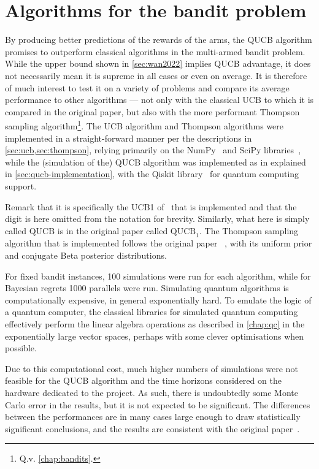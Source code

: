 \section{Algorithms for the bandit problem}
By producing better predictions of the rewards of the arms, the QUCB algorithm promises to outperform classical algorithms in the multi-armed bandit problem.
While the upper bound shown in \cref{sec:wan2022} implies QUCB advantage, it does not necessarily mean it is supreme in all cases or even on average.
It is therefore of much interest to test it on a variety of problems and compare its average performance to other algorithms — not only with the classical UCB to which it is compared in the original paper, but also with the more performant Thompson sampling algorithm\footnote{Q.v. \cref{chap:bandits}.}.
The UCB algorithm and Thompson algorithms were implemented in a straight-forward manner per the descriptions in \cref{sec:ucb,sec:thompson}, relying primarily on the NumPy~\autocite{numpy} and SciPy libraries~\autocite{scipy}, while the (simulation of the) QUCB algorithm was implemented as in explained in \cref{sec:qucb-implementation}, with the Qiskit library~\autocite{qiskit} for quantum computing support.

Remark that it is specifically the UCB1 of~\autocite{auer2002} that is implemented and that the digit is here omitted from the notation for brevity.
Similarly, what here is simply called QUCB is in the original paper called $\text{QUCB}_1$.
The Thompson sampling algorithm that is implemented follows the original paper ~\autocite{thompson1933}, with its uniform prior and conjugate Beta posterior distributions.

For fixed bandit instances, 100 simulations were run for each algorithm, while for Bayesian regrets 1000 parallels were run.
Simulating quantum algorithms is computationally expensive, in general exponentially hard\footnotemark.
To emulate the logic of a quantum computer, the classical libraries for simulated quantum computing effectively perform the linear algebra operations as described in \cref{chap:qc} in the exponentially large vector spaces, perhaps with some clever optimisations when possible.

Due to this computational cost, much higher numbers of simulations were not feasible for the QUCB algorithm and the time horizons considered on the hardware dedicated to the project.
As such, there is undoubtedly some Monte Carlo error in the results, but it is not expected to be significant.
The differences between the performances are in many cases large enough to draw statistically significant conclusions, and the results are consistent with the original paper~\autocite{wan2022}.

